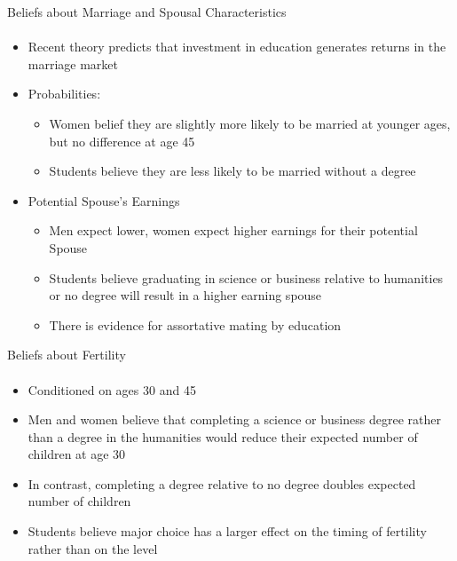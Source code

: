 \documentclass[12pt]{beamer}
\begin{document}
\begin{frame}{Beliefs about Marriage and Spousal Characteristics}
    \framesubtitle{} 
    \begin{itemize}
        \item Recent theory predicts that investment in education generates returns in the marriage market
        \item Probabilities: 
        \begin{itemize}
            \item Women belief they are slightly more likely to be married at younger ages, but no difference at age 45
            \item Students believe they are less likely to be married without a degree
        \end{itemize}
        \item Potential Spouse's Earnings
        \begin{itemize}
            \item Men expect lower, women expect higher earnings for their potential Spouse
            \item Students believe graduating in science or business relative to humanities or no degree will result in a higher earning spouse
            \item There is evidence for assortative mating by education
        \end{itemize}
    \end{itemize}
\end{frame}

\begin{frame}{Beliefs about Fertility}
    \framesubtitle{} 
    \begin{itemize}
        \item Conditioned on ages 30 and 45
        \item Men and women believe that completing a science or business degree rather than a degree in the humanities would reduce their expected number of children at age 30
        \item In contrast, completing a degree relative to no degree doubles expected number of children
        \item Students believe major choice has a larger effect on the timing of fertility rather than on the level
    \end{itemize}
\end{frame}
\end{document}
